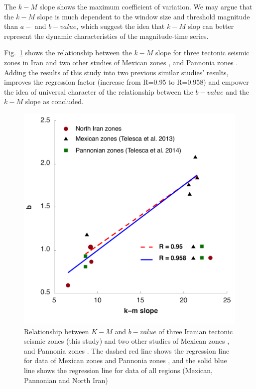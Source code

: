  \noindent
The $k-M$ slope shows the maximum coefficient of variation. We may argue that the $k-M$ slope is much dependent to the window size and threshold magnitude than $a-$ and $b-value$, which suggest the idea that $k-M$ slop can better represent the dynamic characteristics of the magnitude-time series. 
 
 

 
 \noindent
 Fig.~\ref{fig:regression} shows the relationship between the $k-M$ slope for three tectonic seismic zones in Iran and two other studies of Mexican zones \citep{Telesca2013}, and Pannonia zones \citep{Telesca2014}. Adding the results of this study into two previous similar studies' results, improves the regression factor (increase from R=0.95 to R=0.958) and empower the idea of universal character of the relationship between the $b-value$ and the $k-M$ slope as \citet{Telesca2014} concluded. 

\begin{figure} [ht]
\centering
\includegraphics[scale=0.3]{figures/pdf/Figure07.pdf} 
\caption{ Relationship between $K-M$ and $b-value$ of three Iranian tectonic seismic zones (this study) and two other studies of Mexican zones \citep{Telesca2013}, and Pannonia zones \citep{Telesca2014}. The dashed red line shows the regression line for data of  Mexican zones and Pannonia zones \citep{Telesca2014}, and the solid blue line shows the regression line for data of all regions (Mexican, Pannonian and North Iran)}
\label{fig:regression}
\end{figure}


